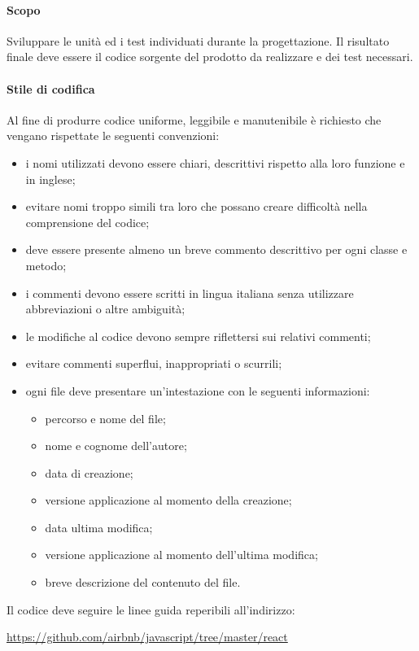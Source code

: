                 \paragraph{Scopo}
                Sviluppare le unità ed i test individuati durante la progettazione. Il risultato finale deve essere il codice sorgente del prodotto da realizzare e dei test necessari.
                
                \paragraph{Stile di codifica}
                Al fine di produrre codice uniforme, leggibile e manutenibile è richiesto che vengano rispettate le seguenti convenzioni:
                \begin{itemize}
                    \item i nomi utilizzati devono essere chiari, descrittivi rispetto alla loro funzione e in inglese;
                    \item evitare nomi troppo simili tra loro che possano creare difficoltà nella comprensione del codice;
                    \item deve essere presente almeno un breve commento descrittivo per ogni classe e metodo;
                    \item i commenti devono essere scritti in lingua italiana senza utilizzare abbreviazioni o altre ambiguità;
                    \item le modifiche al codice devono sempre riflettersi sui relativi commenti;
                    \item evitare commenti superflui, inappropriati o scurrili;
                    \item ogni file deve presentare un'intestazione con le seguenti informazioni:
                        \begin{itemize}
                            \item percorso e nome del file;
                            \item nome e cognome dell'autore;
                            \item data di creazione;
							\item versione applicazione al momento della creazione;
							\item data ultima modifica;
							\item versione applicazione al momento dell'ultima modifica;
                            \item breve descrizione del contenuto del file.
                        \end{itemize}
                \end{itemize}
	            Il codice deve seguire le linee guida reperibili all'indirizzo:
	            \begin{center} \label{sec:stileCodifica}
	            	\url{https://github.com/airbnb/javascript/tree/master/react}
	            \end{center}
            	
